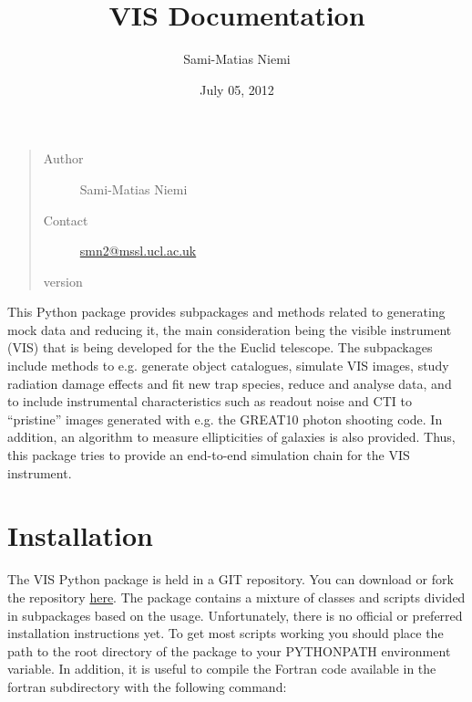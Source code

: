 \documentclass[a4paper,12pt,english]{sphinxmanual}
\title{VIS Documentation}
\date{July 05, 2012}
\author{Sami-Matias Niemi}
\begin{document}
\maketitle
\tableofcontents
{}\label{index::doc}

\begin{quote}\begin{description}
\item[{Author}] \leavevmode
Sami-Matias Niemi

\item[{Contact}] \leavevmode
\href{mailto:smn2@mssl.ucl.ac.uk}{smn2@mssl.ucl.ac.uk}

\item[{version}] 

\end{description}\end{quote}

This Python package provides subpackages and methods related to generating mock data and reducing it, the main
consideration being the visible instrument (VIS) that is being developed for the
the Euclid telescope. The subpackages include methods to e.g. generate object catalogues, simulate VIS images,
study radiation damage effects and fit new trap species, reduce and analyse data, and to include instrumental
characteristics such as readout noise and CTI to ``pristine'' images generated with e.g. the GREAT10 photon
shooting code. In addition, an algorithm to measure ellipticities of galaxies is also provided. Thus,
this package tries to provide an end-to-end simulation chain for the VIS instrument.


\chapter{Installation}
\label{index:installation}\label{index:welcome-to-euclid-visible-instrument-vis-python-package-documentation}
The VIS Python package is held in a GIT repository. You can download or fork the repository
\href{https://bitbucket.org/niemi/vissim-python/overview}{here}. The package contains a mixture of classes
and scripts divided in subpackages based on the usage. Unfortunately, there is no official or preferred
installation instructions yet. To get most scripts working you should place
the path to the root directory of the package to your PYTHONPATH environment variable. In addition, it is
useful to compile the Fortran code available in the fortran subdirectory with the following command:
\end{document}
